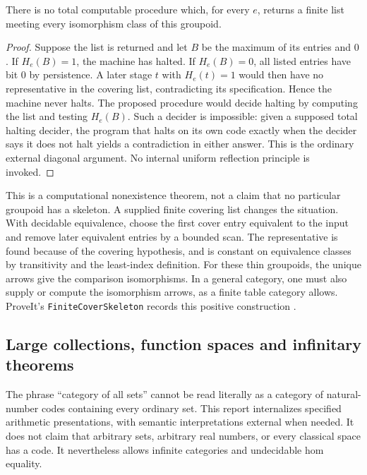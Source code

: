 \begin{proposition}
There is no total computable procedure which, for every $e$, returns a
finite list meeting every isomorphism class of this groupoid.
\end{proposition}
\begin{proof}
Suppose the list is returned and let $B$ be the maximum of its entries
and $0$. If $H_e(B)=1$, the machine has halted. If $H_e(B)=0$, all listed
entries have bit $0$ by persistence. A later stage $t$ with $H_e(t)=1$
would then have no representative in the covering list, contradicting
its specification. Hence the machine never halts. The proposed procedure
would decide halting by computing the list and testing $H_e(B)$.
Such a decider is impossible: given a supposed total halting decider,
the program that halts on its own code exactly when the decider says it
does not halt yields a contradiction in either answer. This is the
ordinary external diagonal argument. No internal uniform reflection
principle is invoked.
\end{proof}

This is a computational nonexistence theorem, not a claim that no
particular groupoid has a skeleton. A supplied finite covering list
changes the situation. With decidable equivalence, choose the first
cover entry equivalent to the input and remove later equivalent entries
by a bounded scan. The representative is found because of the covering
hypothesis, and is constant on equivalence classes by transitivity and
the least-index definition. For these thin groupoids, the unique arrows
give the comparison isomorphisms. In a general category, one must also
supply or compute the isomorphism arrows, as a finite table category
allows. ProveIt's \texttt{FiniteCoverSkeleton} records this positive
construction \cite{repo-skeleton}.

\subsection{Large collections, function spaces and infinitary theorems}
The phrase ``category of all sets'' cannot be read literally as a category
of natural-number codes containing every ordinary set. This report
internalizes specified arithmetic presentations, with semantic
interpretations external when needed. It does not claim that arbitrary
sets, arbitrary real numbers, or every classical space has a code.
It nevertheless allows infinite categories and undecidable hom equality.

